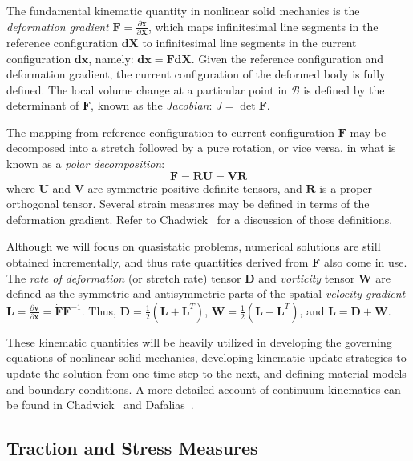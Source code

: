 The fundamental kinematic quantity in nonlinear solid mechanics is the \textit{deformation gradient} $\bm{F} = \frac{\partial \bm{x}}{\partial \bm{X}}$, which maps infinitesimal line segments in the reference configuration $\bm{dX}$ to infinitesimal line segments in the current configuration $\bm{dx}$, namely: $\bm{dx} = \bm{F}\bm{dX}$. Given the reference configuration and deformation gradient, the current configuration of the deformed body is fully defined. The local volume change at a particular point in $\mathcal{B}$ is defined by the determinant of $\bm{F}$, known as the \textit{Jacobian}: $J = \det{\bm{F}}$.

The mapping from reference configuration to current configuration $\bm{F}$ may be decomposed into a  stretch followed by a pure rotation, or vice versa, in what is known as a \textit{polar decomposition}:
\begin{equation}
\bm{F} = \bm{R}\bm{U} = \bm{V}\bm{R}
\end{equation}
where $\bm{U}$ and $\bm{V}$ are symmetric positive definite tensors, and $\bm{R}$ is a proper orthogonal tensor. Several strain measures may be defined in terms of the deformation gradient. Refer to Chadwick~\cite{chadwick_1999} for a discussion of those definitions.

Although we will focus on quasistatic problems, numerical solutions are still obtained incrementally, and thus rate quantities derived from $\bm{F}$ also come in use. The \textit{rate of deformation} (or stretch rate) tensor $\bm{D}$ and \textit{vorticity} tensor $\bm{W}$ are defined as the symmetric and antisymmetric parts of the spatial \textit{velocity gradient} $\bm{L} = \frac{\partial \bm{v}}{\partial \bm{x}} = \dot{\bm{F}}{\bm{F}}^{-1}$. Thus, $\bm{D} = \frac{1}{2}(\bm{L} + \bm{L}^T)$, $\bm{W} = \frac{1}{2}(\bm{L} - \bm{L}^T)$, and $\bm{L} = \bm{D} + \bm{W}$.

These kinematic quantities will be heavily utilized in developing the governing equations of nonlinear solid mechanics, developing kinematic update strategies to update the solution from one time step to the next, and defining material models and boundary conditions. A more detailed account of continuum kinematics can be found in Chadwick~\cite{chadwick_1999} and Dafalias~\cite{dafalias_205}.

\subsection{Traction and Stress Measures}

